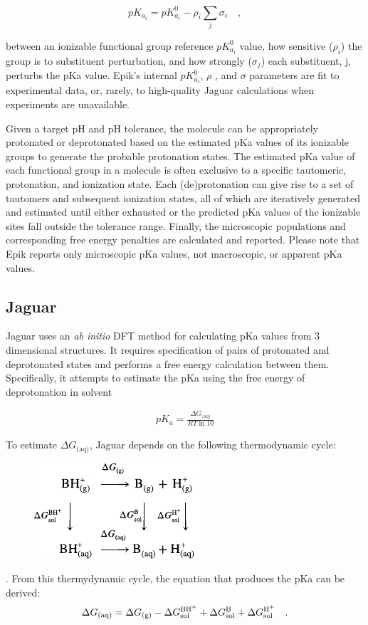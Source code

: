 \documentclass[9pt,lineno,final]{elife}
\begin{document}
\begin{equation}
 pK_{a_i} = pK_{a_i}^0 - \rho_i  \sum_j \sigma_i \quad ,
\end{equation}

between an ionizable functional group reference $pK_{a_i}^0$ value, how sensitive ($\rho_i$) the group is to substituent perturbation, and how strongly ($\sigma_j$) each substituent, j, perturbs the pKa value. Epik’s internal $pK_{a_i}^0$, $\rho$ , and $\sigma$  parameters are fit to experimental data, or, rarely, to high-quality Jaguar calculations when experiments are unavailable.

Given a target pH and pH tolerance, the molecule can be appropriately protonated or deprotonated based on the estimated pKa values of its ionizable groups to generate the probable protonation states. The estimated pKa value of each functional group in a molecule is often exclusive to a specific tautomeric, protonation, and ionization state. Each (de)protonation can give rise to a set of tautomers and subsequent ionization states, all of which are iteratively generated and estimated until either exhausted or the predicted pKa values of the ionizable sites fall outside the tolerance range. Finally, the microscopic populations and corresponding free energy penalties are calculated and reported. Please note that Epik reports only microscopic pKa values, not macroscopic, or apparent pKa values.

\subsection{Jaguar}

Jaguar uses an \textit{ab initio} DFT method for calculating pKa values from 3 dimensional structures. It requires specification of pairs of protonated and deprotonated states and performs a free energy calculation between them. Specifically, it attempts to estimate the pKa using the free energy of deprotonation in solvent

\begin{align}
 pK_a = \frac{\Delta G_\textrm{(aq)}}{RT \ln 10}  
\end{align}

To estimate $ \Delta G_\textrm{(aq)}$, Jaguar depends on the following thermodynamic cycle:
%
\begin{figure}[H]
\centering
 \includegraphics{jaguar-reaction}
\end{figure}
%
. From this thermydynamic cycle, the equation that produces the pKa can be derived:
%
\begin{equation}
 \Delta G_\textrm{(aq)} = \Delta G_\textrm{(g)} - \Delta G^\textrm{\ce{BH+}}_\textrm{sol} + \Delta G^\textrm{\ce{B}}_\textrm{sol}  +  \Delta G^\textrm{\ce{H+}}_\textrm{sol} \quad .
\end{equation}
\end{document}
